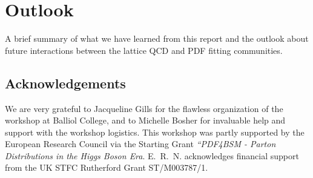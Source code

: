 \section{Outlook}
\label{sec:outlook}

A brief summary of what we have learned from this report
and the outlook about future interactions between the lattice
QCD and PDF fitting communities.


\subsection*{Acknowledgements}

We are very grateful to Jacqueline Gills for the flawless organization
of the workshop at Balliol College, and to Michelle Bosher for
invaluable help and support with the workshop logistics.
%
This workshop was partly supported by the European Research Council via
the Starting Grant {\it ``PDF4BSM - Parton Distributions in the
  Higgs Boson Era}.
%
E.~R.~N. acknowledges financial support from the
UK STFC Rutherford Grant ST/M003787/1.
